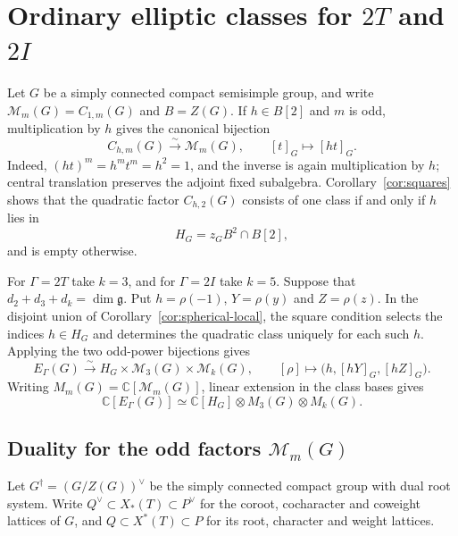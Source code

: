 \documentclass[11pt,a4paper,reqno]{amsart}
\theoremstyle{plain}
\theoremstyle{definition}
\theoremstyle{remark}
\numberwithin{equation}{section}
\newcommand{\CC}{\mathbb C}
\newcommand{\fg}{\mathfrak g}
\newcommand{\cM}{\mathcal M}
\begin{document}
\section{Ordinary elliptic classes for \texorpdfstring{$2T$ and $2I$}{2T and 2I}}\label{sec:odd-models}

Let $G$ be a simply connected compact semisimple group, and write $\cM_m(G)=C_{1,m}(G)$ and $B=Z(G)$. If $h\in B[2]$ and $m$ is odd, multiplication by $h$ gives the canonical bijection
\[
C_{h,m}(G)\xrightarrow{\sim}\cM_m(G),\qquad
[t]_G\longmapsto[ht]_G.
\]
Indeed, $(ht)^m=h^mt^m=h^2=1$, and the inverse is again multiplication by $h$; central translation preserves the adjoint fixed subalgebra. Corollary~\ref{cor:squares} shows that the quadratic factor $C_{h,2}(G)$ consists of one class if and only if $h$ lies in
\[
H_G=z_GB^2\cap B[2],
\]
and is empty otherwise.

For $\Gamma=2T$ take $k=3$, and for $\Gamma=2I$ take $k=5$. Suppose that $d_2+d_3+d_k=\dim\fg$. Put $h=\rho(-1)$, $Y=\rho(y)$ and $Z=\rho(z)$. In the disjoint union of Corollary~\ref{cor:spherical-local}, the square condition selects the indices $h\in H_G$ and determines the quadratic class uniquely for each such $h$. Applying the two odd-power bijections gives
\begin{equation}\label{eq:spherical-model}
E_\Gamma(G)\xrightarrow{\sim}H_G\times\cM_3(G)\times\cM_k(G),
\qquad [\rho]\longmapsto\bigl(h,[hY]_G,[hZ]_G\bigr).
\end{equation}
Writing $M_m(G)=\CC[\cM_m(G)]$, linear extension in the class bases gives
\[
\CC[E_\Gamma(G)]\simeq\CC[H_G]\otimes M_3(G)\otimes M_k(G).
\]

\subsection{Duality for the odd factors \texorpdfstring{$\cM_m(G)$}{Mm(G)}}

Let $G^\dagger=(G/Z(G))^\vee$ be the simply connected compact group with dual root system. Write $Q^\vee\subset X_*(T)\subset P^\vee$ for the coroot, cocharacter and coweight lattices of $G$, and $Q\subset X^*(T)\subset P$ for its root, character and weight lattices.
\end{document}
